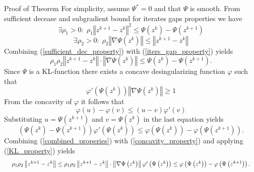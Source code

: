 \documentclass[9pt,handout]{beamer} %
\newcommand{\norm}[1]{\left\Vert {#1} \right\Vert} %
\begin{document}
	\begin{frame}{Proof of Theorem}
		For simplicity, assume $\Psi^{*} = 0$ and that $\Psi$ is smooth. From sufficient decease and subgradient bound for iterates gaps properties we have
		\begin{equation}
			\exists \rho_1>0 : \; \rho_1 \norm{z^{k+1} - z^k}^2 \leq \Psi\left(z^k\right) - \Psi\left(z^{k+1}\right) \label{sufficient_dec_property}
		\end{equation}
		\begin{equation}
			\exists \rho_2>0 : \; \rho_2\norm{\nabla \Psi\left(z^{k}\right)} \leq \norm{z^{k+1} - z^k} \label{iters_gap_property}
		\end{equation}
		Combining (\ref{sufficient_dec_property}) with (\ref{iters_gap_property}) yields
		\begin{equation}
			\rho_1 \rho_2 \norm{z^{k+1} - z^k} \cdot \norm{\nabla \Psi\left(z^{k}\right)} \leq \Psi\left(z^k\right) - \Psi\left(z^{k+1}\right). \label{combined_properies}
		\end{equation}
		Since $\Psi$ is a KL-function there exists a concave desingularizing function $\varphi$ such that
		\begin{equation}
			\varphi'\left(\Psi\left(z^k\right)\right) \norm{\nabla \Psi\left(z^k\right)} \geq 1 \label{KL_property}
		\end{equation}
		From the concavity of $\varphi$ it follows that
		\begin{equation*}
			\varphi(u) - \varphi(v) \leq (u-v) \varphi'(v)
		\end{equation*}
		Substituting $u=\Psi\left(z^{k+1}\right)$ and $v=\Psi\left(z^k\right)$ in the last equation yields
		\begin{equation}
			\left(\Psi\left(z^k\right) - \Psi\left(z^{k+1}\right)\right) \varphi'\left(\Psi\left(z^k\right)\right) \leq \varphi\left(\Psi\left(z^k\right)\right) - \varphi\left(\Psi\left(z^{k+1}\right)\right). \label{concavity_property}
		\end{equation}
		Combining (\ref{combined_properies}) with (\ref{concavity_property}) and applying (\ref{KL_property}) yields		
		\begin{equation*}
			\resizebox{\textwidth}{!}{
			$
			\rho_1 \rho_2 \norm{z^{k+1} - z^k} \leq \rho_1 \rho_2 \norm{z^{k+1} - z^k} \cdot \norm{\nabla \Psi\left(z^{k}\right)} \varphi'\left(\Psi\left(z^k\right)\right) \leq \varphi\left(\Psi\left(z^k\right)\right) - \varphi\left(\Psi\left(z^{k+1}\right)\right).
			$
			}
		\end{equation*} 
	\end{frame}
	
\end{document}

